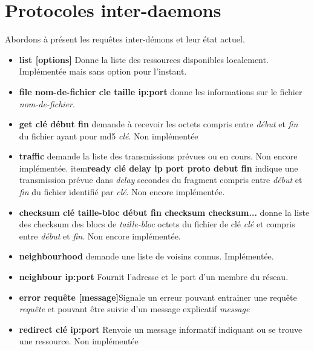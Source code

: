 	\section{Protocoles inter-daemons}
	Abordons à présent les requêtes inter-démons et leur état actuel.

\begin{itemize}
\item{\textbf{list [options]}} Donne la liste des ressources disponibles 
localement. Implémentée mais sans option pour l'instant.
\item{\textbf{file nom-de-fichier cle taille ip:port}} donne les informations
 sur le fichier \textit{nom-de-fichier}.
\item{\textbf{get clé début fin}} demande à recevoir les octets compris entre
 \textit{début} et \textit{fin} du 
fichier ayant pour md5 \textit{clé}. Non implémentée
\item{\textbf{traffic}} demande la liste des transmissions prévues ou en cours.
 Non encore implémentée.
item{\textbf{ready clé delay ip port proto debut fin}} indique une transmission
 prévue dans \textit{delay} secondes 
du fragment compris entre \textit{début} et \textit{fin} du fichier identifié
 par \textit{clé}. Non encore implémentée.
\item{\textbf{checksum clé taille-bloc début fin checksum checksum...}} donne 
la liste des checksum des blocs de
 \textit{taille-bloc} octets du fichier de clé \textit{clé} et compris entre
 \textit{début} et \textit{fin}. Non encore implémentée.
\item{\textbf{neighbourhood}} demande une liste de voisins connus. Implémentée.
\item{\textbf{neighbour ip:port}} Fournit l'adresse et le port d'un membre du
 réseau.
\item{\textbf{error requête [message]}}Signale un erreur pouvant entrainer une 
requête \textit{requête} et
 pouvant être suivie d'un message explicatif \textit{message}
\item{\textbf{redirect clé ip:port}} Renvoie un message informatif indiquant 
ou se trouve une ressource. Non implémentée
\end{itemize}

	\paragraph*{}
